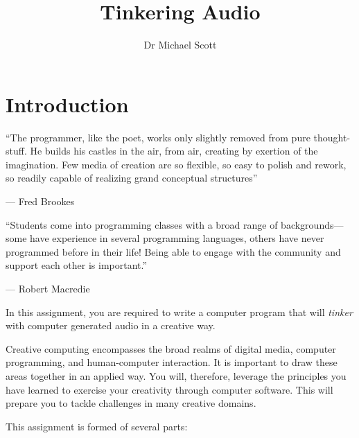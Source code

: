 \documentclass{../../fal_assignment}
\title{Tinkering Audio}
\author{Dr Michael Scott}
\begin{document}
\maketitle

\section*{Introduction}

\begin{marginquote}
``The programmer, like the poet, works only slightly removed from pure thought-stuff. He builds his castles in the air, from air, creating by exertion of the imagination. Few media of creation are so flexible, so easy to polish and rework, so readily capable of realizing grand conceptual structures''

--- Fred Brookes

\marginquoterule

``Students come into programming classes with a broad range of backgrounds---some have experience in several programming languages, others have never programmed before in their life! Being able to engage with the community and support each other is important.''

--- Robert Macredie 
\end{marginquote}

In this assignment, you are required to write a computer program that will \textit{tinker} with computer generated audio in a creative way.

Creative computing encompasses the broad realms of digital media, computer programming, and human-computer interaction. It is important to draw these areas together in an applied way. You will, therefore, leverage the principles you have learned to exercise your creativity through computer software. This will prepare you to tackle challenges in many creative domains.

This assignment is formed of several parts:
\end{document}
